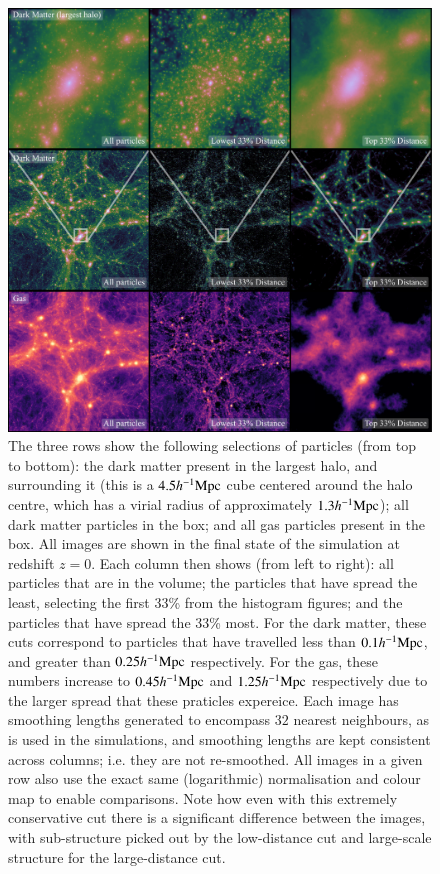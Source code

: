 \begin{figure}
    \centering
    \vspace{1cm}
    \includegraphics[width=\textwidth]{report/figures/distance_figures_3.pdf}
    \caption{The three rows show the following selections of particles (from top to bottom):
        the dark matter present in the largest halo, and surrounding it (this is a $4.5h^{-1}{\rm Mpc}{}$
        cube centered around the halo centre, which has a virial radius of approximately $1.3h^{-1}{\rm Mpc}{}$);
        all dark matter particles in the box; and all gas particles present in the box. All images
        are shown in the final state of the simulation at redshift $z=0$. Each column then shows
        (from left to right): all particles that are in the volume; the particles that have spread
        the least, selecting the first 33\% from the histogram figures; and the particles that have
        spread the 33\% most. For the dark matter, these cuts correspond to particles that have travelled
        less than $0.1h^{-1}{\rm Mpc}{}$, and greater than $0.25h^{-1}{\rm Mpc}{}$ respectively. For the gas, these numbers
        increase to $0.45h^{-1}{\rm Mpc}{}$ and $1.25h^{-1}{\rm Mpc}{}$ respectively due to the larger spread that these
        praticles expereice. Each image has smoothing lengths generated to encompass $32$ nearest
        neighbours, as is used in the \simba{} simulations, and smoothing lengths are kept consistent
        across columns; i.e. they are not re-smoothed. All images in a given row also use the exact
        same (logarithmic) normalisation and colour map to enable comparisons. Note how even with this
        extremely conservative cut there is a significant difference between the images, with sub-structure
        picked out by the low-distance cut and large-scale structure for the large-distance cut.}
    \vspace{1cm}
    \label{fig:bigdistanceimage}
\end{figure}



